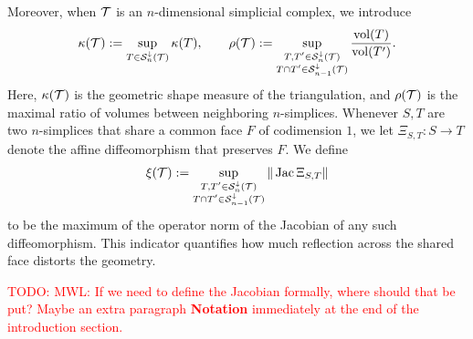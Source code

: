 \documentclass[12pt,a4paper]{article}
\newcommand{\todo}[1]{\textcolor{red}{TODO: #1}}
\begin{document}
Moreover, when ${\mathcal T}$ is an $n$-dimensional simplicial complex, we introduce 
\begin{align}\label{math:moremeasures}
    \kappa({\mathcal T}) := \sup_{ T \in {\mathcal S}^{\downarrow}_{n}({\mathcal T}) } \kappa(T),
    \qquad 
    \rho({\mathcal T}) := \sup_{ \substack{ T, T' \in {\mathcal S}^{\downarrow}_{n}({\mathcal T}) \\ T \cap T' \in {\mathcal S}^{\downarrow}_{n-1}({\mathcal T}) } } \frac{ \operatorname{vol}(T) }{ \operatorname{vol}(T') }.
\end{align}
Here, $\kappa({\mathcal T})$ is the geometric shape measure of the triangulation, and $\rho({\mathcal T})$ is the maximal ratio of volumes between neighboring $n$-simplices. 
Whenever $S,T$ are two $n$-simplices that share a common face $F$ of codimension $1$, we let $\Xi_{S,T} : S \rightarrow T$ denote the affine diffeomorphism 
that preserves $F$. We define 
\begin{align}\label{math:reflectionmeasure}
    \xi({\mathcal T}) 
    := 
    \sup_{ \substack{ T, T' \in {\mathcal S}^{\downarrow}_{n}({\mathcal T}) \\ T \cap T' \in {\mathcal S}^{\downarrow}_{n-1}({\mathcal T}) } }
    \| \operatorname{{\rm Jac}} \Xi_{S,T} \|
\end{align}
to be the maximum of the operator norm of the Jacobian of any such diffeomorphism. 
This indicator quantifies how much reflection across the shared face distorts the geometry. 













\todo{MWL: If we need to define the Jacobian formally, where should that be put? Maybe an extra paragraph \textbf{Notation} immediately at the end of the introduction section.}
\end{document}
